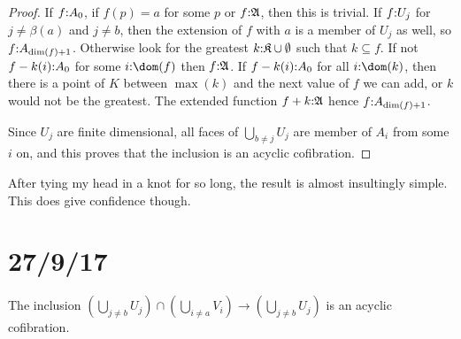 \documentclass[csh.tex]{subfiles}
\begin{document}
\begin{proof}
If $f\mathord : A_0$, if $f(p) = a$ for some $p$ or $f\mathord : \mathfrak A$, then this is trivial.
If $f\mathord : U_j$ for $j\neq \beta(a)$ and $j\neq b$, then the extension of $f$ with $a$ is a member of $U_j$ as well, so $f\mathord : A_{\dim(f)+1}$.
Otherwise look for the greatest $k\mathord :\mathfrak K\cup{\emptyset}$ such that $k\subseteq f$. If not $f - k(i)\mathord : A_0$ for some $i\of \dom(f)$ then $f\mathord : \mathfrak A$. If $f - k(i)\mathord : A_0$ for all $i\of\dom(k)$, then there is a point of $K$ between $\max(k)$ and the next value of $f$ we can add, or $k$ would not be the greatest. The extended function $f + k\mathord :\mathfrak A$ hence $f\mathord : A_{\dim(f)+1}$.

Since $U_j$ are finite dimensional, all faces of $\bigcup_{b\neq j} U_j$ are member of $A_i$ from some $i$ on, and this proves that the inclusion is an acyclic cofibration.
\end{proof}

After tying my head in a knot for so long, the result is almost insultingly simple. This does give confidence though.

\section{27/9/17}

\begin{proposition} The inclusion $(\bigcup_{j\neq b} U_j) \cap (\bigcup_{i\neq a} V_i)\to (\bigcup_{j\neq b} U_j) $ is an acyclic cofibration.
\end{proposition}
\end{document}
